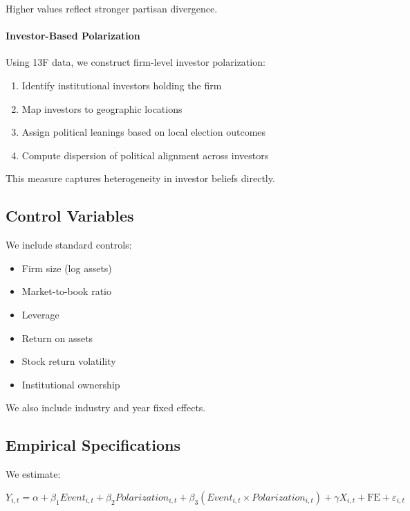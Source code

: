 Higher values reflect stronger partisan divergence.

\paragraph{Investor-Based Polarization}

Using 13F data, we construct firm-level investor polarization:

\begin{enumerate}
    \item Identify institutional investors holding the firm
    \item Map investors to geographic locations
    \item Assign political leanings based on local election outcomes
    \item Compute dispersion of political alignment across investors
\end{enumerate}

This measure captures heterogeneity in investor beliefs directly.

\subsection{Control Variables}

We include standard controls:

\begin{itemize}
    \item Firm size (log assets)
    \item Market-to-book ratio
    \item Leverage
    \item Return on assets
    \item Stock return volatility
    \item Institutional ownership
\end{itemize}

We also include industry and year fixed effects.

\subsection{Empirical Specifications}

We estimate:

\begin{equation}
Y_{i,t} = \alpha + \beta_1 Event_{i,t} + \beta_2 Polarization_{i,t} + \beta_3 (Event_{i,t} \times Polarization_{i,t}) + \gamma X_{i,t} + \text{FE} + \varepsilon_{i,t}
\end{equation}

